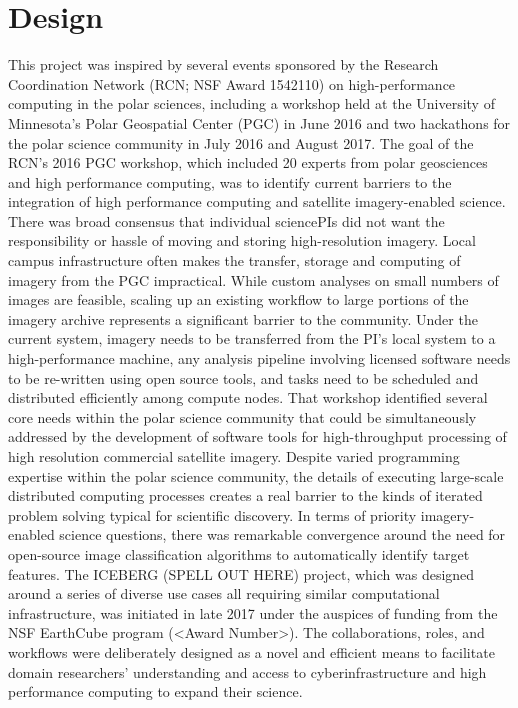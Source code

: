 \documentclass[manuscript,screen]{acmart}
\begin{document}
\section{Design}
This project was inspired by several events sponsored by the Research Coordination Network (RCN; NSF Award 1542110) on high-performance computing in the polar sciences, including a workshop held at the University of Minnesota’s Polar Geospatial Center (PGC) in June 2016 and two hackathons for the polar science community in July 2016 and August 2017. The goal of the RCN’s 2016 PGC workshop, which included 20 experts from polar geosciences and high performance computing, was to identify current barriers to the integration of high performance computing and satellite imagery-enabled science.  There was broad consensus that individual sciencePIs did not want the responsibility or hassle of moving and storing high-resolution imagery. Local campus infrastructure often makes the transfer, storage and computing of imagery from the PGC impractical. While custom analyses on small numbers of images are feasible, scaling up an existing workflow to large portions of the imagery archive represents a significant barrier to the community. Under the current system, imagery needs to be transferred from the PI’s local system to a high-performance machine, any analysis pipeline involving licensed software needs to be re-written using open source tools, and tasks need to be scheduled and distributed efficiently among compute nodes. That workshop identified several core needs within the polar science community that could be simultaneously addressed by the development of software tools for high-throughput processing of high resolution commercial satellite imagery. Despite varied programming expertise within the polar science community, the details of executing large-scale distributed computing processes creates a real barrier to the kinds of iterated problem solving typical for scientific discovery. In terms of priority imagery-enabled science questions, there was remarkable convergence around the need for open-source image classification algorithms to automatically identify target features. The ICEBERG (SPELL OUT HERE) project, which was designed around a series of diverse use cases all requiring similar computational infrastructure, was initiated in late 2017 under the auspices of funding from the NSF EarthCube program (<Award Number>). The collaborations, roles, and workflows were deliberately designed as a novel and efficient means to facilitate domain researchers' understanding and access to cyberinfrastructure and high performance computing to expand their science. 
\end{document}
